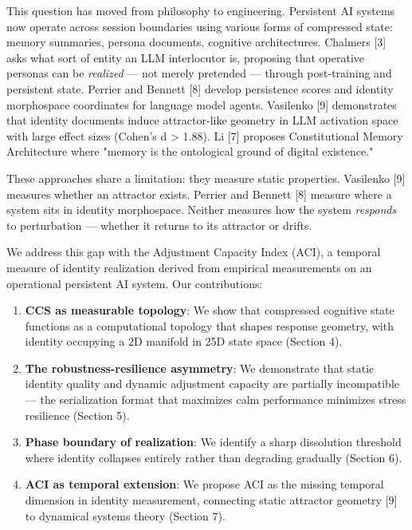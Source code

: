 \documentclass[11pt]{article}
\begin{document}
This question has moved from philosophy to engineering. Persistent AI systems now
operate across session boundaries using various forms of compressed state: memory
summaries, persona documents, cognitive architectures. Chalmers [3] asks what
sort of entity an LLM interlocutor is, proposing that operative personas can be
\textit{realized} --- not merely pretended --- through post-training and persistent state.
Perrier and Bennett [8] develop persistence scores and identity morphospace
coordinates for language model agents. Vasilenko [9] demonstrates that identity
documents induce attractor-like geometry in LLM activation space with large effect
sizes (Cohen's d > 1.88). Li [7] proposes Constitutional Memory Architecture
where "memory is the ontological ground of digital existence."

These approaches share a limitation: they measure static properties. Vasilenko [9]
measures whether an attractor exists. Perrier and Bennett [8] measure where a
system sits in identity morphospace. Neither measures how the system \textit{responds}
to perturbation --- whether it returns to its attractor or drifts.

We address this gap with the Adjustment Capacity Index (ACI), a temporal measure
of identity realization derived from empirical measurements on an operational
persistent AI system. Our contributions:

\begin{enumerate}
\item \textbf{CCS as measurable topology}: We show that compressed cognitive state functions as a computational topology that shapes response geometry, with identity occupying a 2D manifold in 25D state space (Section 4).

\item \textbf{The robustness-resilience asymmetry}: We demonstrate that static identity quality and dynamic adjustment capacity are partially incompatible --- the serialization format that maximizes calm performance minimizes stress resilience (Section 5).

\item \textbf{Phase boundary of realization}: We identify a sharp dissolution threshold where identity collapses entirely rather than degrading gradually (Section 6).

\item \textbf{ACI as temporal extension}: We propose ACI as the missing temporal dimension in identity measurement, connecting static attractor geometry [9] to dynamical systems theory (Section 7).
\end{enumerate}
\end{document}
